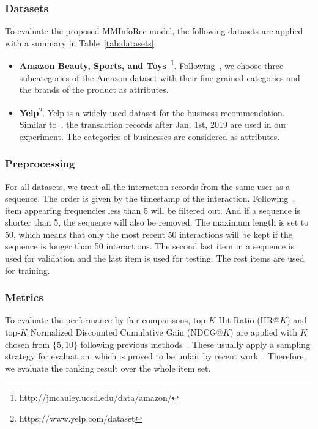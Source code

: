\documentclass[conference]{IEEEtran}
\begin{document}
\subsubsection{Datasets}
\label{sec:datasets}
To evaluate the proposed MMInfoRec model, the following datasets are applied with a summary in Table~\ref{tab:datasets}:
\begin{itemize}
    \item \textbf{Amazon Beauty, Sports, and Toys}~\cite{amazon}\footnote{http://jmcauley.ucsd.edu/data/amazon/}. Following~\cite{bert4rec,s3rec,s2s}, we choose three subcategories of the Amazon dataset with their fine-grained categories and the brands of the product as attributes.
    \item \textbf{Yelp}\footnote{https://www.yelp.com/dataset}. Yelp is a widely used dataset for the business recommendation. Similar to~\cite{s3rec}, the transaction records after Jan. 1st, 2019 are used in our experiment. The categories of businesses are considered as attributes.
\end{itemize}

\subsubsection{Preprocessing}
\label{sec:prepro}
For all datasets, we treat all the interaction records from the same user as a sequence. The order is given by the timestamp of the interaction. Following~\cite{s3rec,bert4rec,fdsa}, item appearing frequencies less than 5 will be filtered out. And if a sequence is shorter than 5, the sequence will also be removed. The maximum length is set to 50, which means that only the most recent 50 interactions will be kept if the sequence is longer than 50 interactions. The second last item in a sequence is used for validation and the last item is used for testing. The rest items are used for training.

\subsubsection{Metrics}
\label{sec:metric}
To evaluate the performance by fair comparisons, top-$K$ Hit Ratio (HR@$K$) and top-$K$ Normalized Discounted Cumulative Gain (NDCG@$K$) are applied with $K$ chosen from $\{5,10\}$ following previous methods~\cite{bert4rec,s3rec,s2s}. These usually apply a sampling strategy for evaluation, which is proved to be unfair by recent work~\cite{metric}. Therefore, we evaluate the ranking result over the whole item set.
\end{document}
